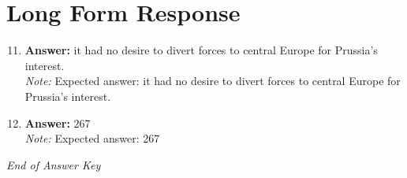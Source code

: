 \documentclass[12pt]{article}
\begin{document}
\section*{Long Form Response}
\begin{enumerate}[label=\arabic*.]
\setcounter{enumi}{10}
\item \textbf{Answer:} it had no desire to divert forces to central Europe for Prussia's interest.
\\ \textit{Note:} Expected answer: it had no desire to divert forces to central Europe for Prussia's interest.
\item \textbf{Answer:} 267
\\ \textit{Note:} Expected answer: 267
\end{enumerate}

\vfill
\noindent\textit{End of Answer Key}
\end{document}
